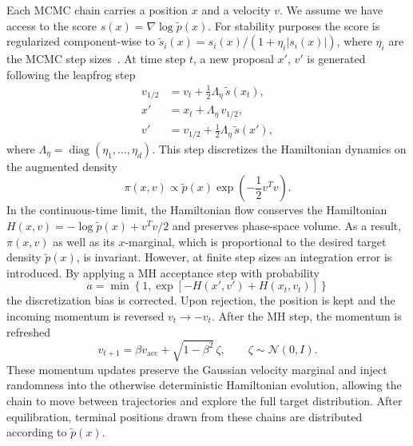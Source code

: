 \documentclass[11pt]{article}
\begin{document}
Each MCMC chain carries a position $x$ and a velocity $v$. 
We assume we have access to the score $s(x) = \nabla \log \widetilde{p}(x)$. 
For stability purposes the score is regularized component-wise to $\widetilde{s}_i(x) = s_i(x) / (1 + \eta_i |s_i(x)|)$, where $\eta_i$ are the MCMC step sizes~\cite{brosse2019tamed}.
At time step $t$, a new proposal $x'$, $v'$ is generated following the leapfrog step 
\begin{align}
  v_{1/2} &= v_t + \frac{1}{2}\Lambda_\eta \, \widetilde{s}(x_t), \nonumber \\
  x' &= x_t + \Lambda_\eta \, v_{1/2}, \nonumber \\
  v' &= v_{1/2} + \frac{1}{2}\Lambda_\eta \, \widetilde{s}(x'),
\end{align}
where $\Lambda_\eta=\operatorname{diag}(\eta_1,\ldots,\eta_d)$.
This step discretizes the Hamiltonian dynamics on the augmented density
\begin{equation}
  \pi(x,v) \propto \widetilde{p}(x)\exp\left(-\frac{1}{2}v^Tv\right).
\end{equation}
In the continuous-time limit, the Hamiltonian flow conserves the Hamiltonian $H(x,v) = -\log \widetilde{p}(x) + v^Tv/2$ and preserves phase-space volume. 
As a result, $\pi(x,v)$ as well as its $x$-marginal, which is proportional to the desired target density $\widetilde{p}(x)$, is invariant.
However, at finite step sizes an integration error is introduced.
By applying a MH acceptance step with probability
\begin{equation}
  a = \min\left\{1, \exp\left[-H(x',v') + H(x_t,v_t)\right]\right\}
\end{equation}
the discretization bias is corrected.
Upon rejection, the position is kept and the incoming momentum is reversed $v_t \rightarrow -v_t$. 
After the MH step, the momentum is refreshed
\begin{equation}
  v_{t+1} = \beta v_{\mathrm{acc}} + \sqrt{1-\beta^2}\,\zeta, \qquad \zeta \sim \mathcal{N}(0,I).
\end{equation}
These momentum updates preserve the Gaussian velocity marginal and inject randomness into the otherwise deterministic Hamiltonian evolution, allowing the chain to move between trajectories and explore the full target distribution.
After equilibration, terminal positions drawn from these chains are distributed according to $\widetilde{p}(x)$.
\end{document}
